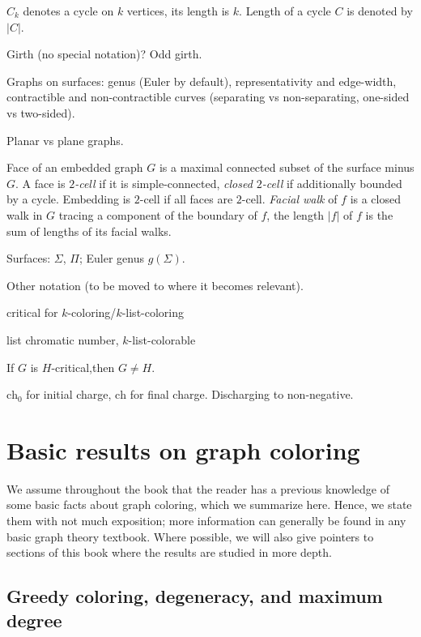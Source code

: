 \documentclass[12pt,twoside,openright,a4paper]{book}
\newcommand{\initch}{\text{ch}_0}
\newcommand{\finch}{\text{ch}}
\begin{document}
$C_k$ denotes a cycle on $k$ vertices, its length is $k$.  Length of a cycle $C$ is denoted by $|C|$.

Girth (no special notation)? Odd girth.

Graphs on surfaces: genus (Euler by default), representativity and edge-width, contractible and
non-contractible curves (separating vs non-separating, one-sided vs two-sided).

Planar vs plane graphs.

Face of an embedded graph $G$ is a maximal connected subset of the surface minus $G$.
A face is \emph{$2$-cell} if it is simple-connected, \emph{closed $2$-cell}
if additionally bounded by a cycle.  Embedding is $2$-cell if all faces are $2$-cell.
\emph{Facial walk} of $f$ is a closed walk in $G$ tracing
a component of the boundary of $f$, the length $|f|$ of $f$ is the sum of lengths of its facial
walks.

Surfaces: $\Sigma$, $\Pi$; Euler genus $g(\Sigma)$.

Other notation (to be moved to where it becomes relevant).

critical for $k$-coloring/$k$-list-coloring

list chromatic number, $k$-list-colorable

If $G$ is $H$-critical,then $G\neq H$.

$\initch$ for initial charge, $\finch$ for final charge.  Discharging to non-negative.

\section{Basic results on graph coloring}

We assume throughout the book that the reader has a previous knowledge of some basic facts
about graph coloring, which we summarize here.  Hence, we state them with not much exposition;
more information can generally be found in any basic graph theory textbook.
Where possible, we will also give pointers to sections of this book where the results are
studied in more depth.

\subsection{Greedy coloring, degeneracy, and maximum degree}
\end{document}
